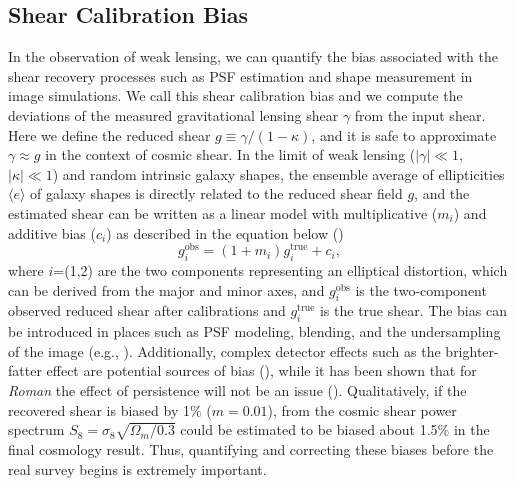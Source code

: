 \documentclass[fleqn,usenatbib]{mnras}
\begin{document}

\subsection{Shear Calibration Bias}
In the observation of weak lensing, we can quantify the bias associated with the shear recovery processes such as PSF estimation and shape measurement in image simulations. We call this shear calibration bias and we compute the deviations of the measured gravitational lensing shear $\gamma$ from the input shear. Here we define the reduced shear $g \equiv \gamma/(1-\kappa)$, and it is safe to approximate $\gamma \approx g$ in the context of cosmic shear. In the limit of weak lensing ($\lvert\gamma\rvert\ll1$, $\lvert\kappa\rvert\ll1$) and random intrinsic galaxy shapes, the ensemble average of ellipticities $\langle e \rangle$ of galaxy shapes is directly related to the reduced shear field $g$, and the estimated shear can be written as a linear model with multiplicative ($m_{i}$) and additive bias ($c_{i}$) as described in the equation below (\citealt{2006MNRAS.368.1323H, 2006MNRAS.366..101H, 2007MNRAS.376...13M}) 
\begin{equation}
    g^{\textrm{obs}}_{i} = (1+m_{i})g^{\textrm{true}}_{i} + c_{i}, 
    \label{eqn:linear}
\end{equation}
where $i$=(1,2) are the two components representing an elliptical distortion, which can be derived from the major and minor axes, and $g^{\textrm{obs}}_{i}$ is the two-component observed reduced shear after calibrations and $g^{\textrm{true}}_{i}$ is the true shear. The bias can be introduced in places such as PSF modeling, blending, and the undersampling of the image (e.g., \citealt{2018ARA&A..56..393M}). Additionally, complex detector effects such as the brighter-fatter effect are potential sources of bias (\citealt{2020PASP..132a4502C}), while it has been shown that for \emph{Roman} the effect of persistence will not be an issue (\citealt{2021arXiv210610273L}). Qualitatively, if the recovered shear is biased by 1$\%$ ($m=0.01$), from the cosmic shear power spectrum $S_{8} = \sigma_{8} \sqrt{\Omega_{m}/0.3}$ could be estimated to be biased about 1.5$\%$ in the final cosmology result. Thus, quantifying and correcting these biases before the real survey begins is extremely important. 
\end{document}
